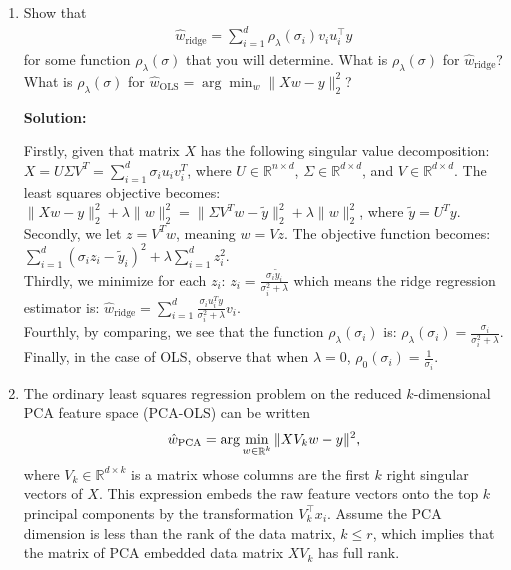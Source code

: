 \documentclass{article}
\DeclareMathOperator{\R}{\mathbb{R}}
\newenvironment{solution}{\color{blue} \smallskip \textbf{Solution:}}{}
\begin{document}
\begin{enumerate}

\item Show that 
\begin{align*}
\widehat{w}_{\mathrm{ridge}} = \sum_{i=1}^d \rho_{\lambda}(\sigma_i) v_i  u_i^\top y
\end{align*}
for some function $\rho_{\lambda}(\sigma)$ that you will determine.
What is $\rho_{\lambda}(\sigma)$ for 
$\widehat{w}_{\mathrm{ridge}}$?
What is $\rho_{\lambda}(\sigma)$ for 
$\widehat{w}_{\mathrm{OLS}} = \arg \min_{w} \| X w - y\|_2^2$?

\begin{solution}

Firstly, given that  matrix \(X\) has the following singular value decomposition: 
\( X = U \Sigma V^T = \sum_{i=1}^{d} \sigma_i u_i v_i^T \),
where \(U \in \mathbb{R}^{n \times d}\), \(\Sigma \in \mathbb{R}^{d \times d}\), and \(V \in \mathbb{R}^{d \times d}\). The least squares objective becomes: 
\( \|Xw - y\|_2^2 + \lambda \|w\|_2^2 = \|\Sigma V^T w - \tilde{y}\|_2^2 + \lambda \|w\|_2^2 \), where \(\tilde{y} = U^T y\).\\

Secondly, we let \(z = V^T w\), meaning \(w = V z\). The objective function becomes: 
\( \sum_{i=1}^{d} (\sigma_i z_i - \tilde{y}_i)^2 + \lambda \sum_{i=1}^{d} z_i^2 \).\\

Thirdly, we minimize for each \(z_i\): 
\( z_i = \frac{\sigma_i \tilde{y}_i}{\sigma_i^2 + \lambda} \) which means the ridge regression estimator is: 
\( \hat{w}_{\text{ridge}} = \sum_{i=1}^{d} \frac{\sigma_i u_i^T y}{\sigma_i^2 + \lambda} v_i \).\\

Fourthly, by comparing, we see that the function \(\rho_{\lambda}(\sigma_i)\) is: 
\( \rho_{\lambda}(\sigma_i) = \frac{\sigma_i}{\sigma_i^2 + \lambda} \).\\

Finally, in the case of OLS, observe that when \(\lambda = 0\), \( \rho_0(\sigma_i) = \frac{1}{\sigma_i} \).




\end{solution}

\newpage
\item The ordinary least squares regression problem on the reduced $k$-dimensional PCA feature space (PCA-OLS) can be written
\begin{equation*} \hatwPCA = \arg \min_{ {w}\in\R^k} \| X V_k {w}
- {y}\|^2, \end{equation*} where $V_k \in \mathbb{R}^{d \times k}$
is a matrix whose columns are the first $k$ right singular vectors of $X$.
This expression embeds the raw feature vectors onto the top $k$ principal components by the transformation $V_k^\top x_i$. Assume the PCA dimension is less than the rank of the data matrix, $k\leq r$, which implies that the matrix of PCA embedded data matrix $X V_k$ has full rank. 


\end{enumerate}
\end{document}
